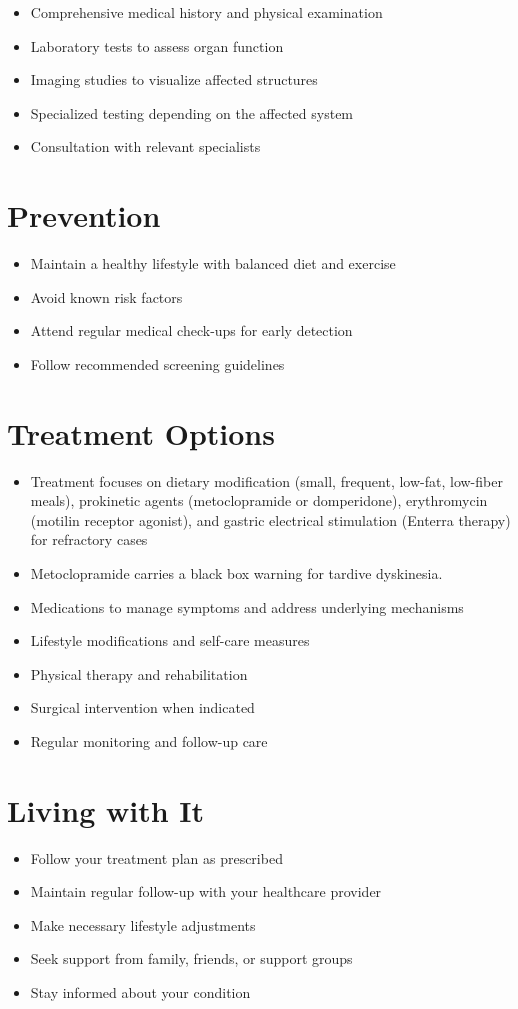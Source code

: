 \begin{itemize}[noitemsep]
  \item Comprehensive medical history and physical examination
  \item Laboratory tests to assess organ function
  \item Imaging studies to visualize affected structures
  \item Specialized testing depending on the affected system
  \item Consultation with relevant specialists
\end{itemize}
\section{Prevention}
\begin{itemize}[noitemsep]
  \item Maintain a healthy lifestyle with balanced diet and exercise
  \item Avoid known risk factors
  \item Attend regular medical check-ups for early detection
  \item Follow recommended screening guidelines
\end{itemize}
\section{Treatment Options}
\begin{itemize}[noitemsep]
  \item Treatment focuses on dietary modification (small, frequent, low-fat, low-fiber meals), prokinetic agents (metoclopramide or domperidone), erythromycin (motilin receptor agonist), and gastric electrical stimulation (Enterra therapy) for refractory cases
  \item Metoclopramide carries a black box warning for tardive dyskinesia.
  \item Medications to manage symptoms and address underlying mechanisms
  \item Lifestyle modifications and self-care measures
  \item Physical therapy and rehabilitation
  \item Surgical intervention when indicated
  \item Regular monitoring and follow-up care
\end{itemize}
\section{Living with It}
\begin{itemize}[noitemsep]
  \item Follow your treatment plan as prescribed
  \item Maintain regular follow-up with your healthcare provider
  \item Make necessary lifestyle adjustments
  \item Seek support from family, friends, or support groups
  \item Stay informed about your condition
\end{itemize}
